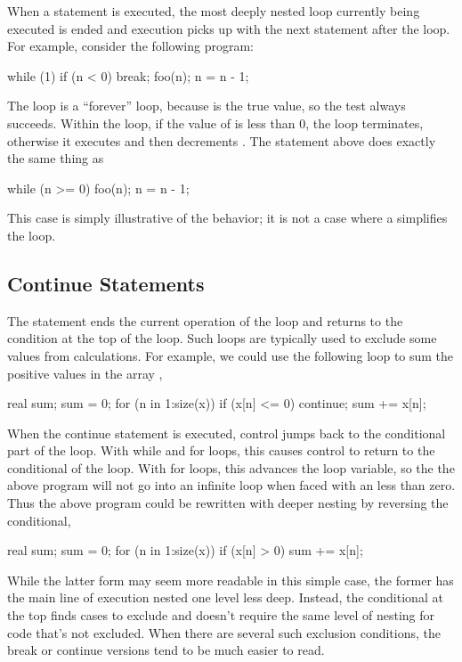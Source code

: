 When a  statement is executed, the most deeply nested loop
currently being executed is ended and execution picks up with the next
statement after the loop.  For example, consider the following
program:
%
\begin{stancode}
while (1) {
  if (n < 0) break;
  foo(n);
  n = n - 1;
}
\end{stancode}
%
The  loop is a ``forever'' loop, because  is
the true value, so the test always succeeds.  Within the loop, if the
value of  is less than 0, the loop terminates, otherwise it
executes  and then decrements .  The statement
above does exactly the same thing as
%
\begin{stancode}
while (n >= 0) {
  foo(n);
  n = n - 1;
}
\end{stancode}
%
This case is simply illustrative of the behavior; it is not a case
where a  simplifies the loop.

\subsection{Continue Statements}

The  statement ends the current operation of the loop
and returns to the condition at the top of the loop.  Such loops are
typically used to exclude some values from calculations.  For example,
we could use the following loop to sum the positive values in the
array ,
%
\begin{stancode}
real sum;
sum = 0;
for (n in 1:size(x)) {
  if (x[n] <= 0) continue;
  sum += x[n];
}
\end{stancode}
%
When the continue statement is executed, control jumps back to the
conditional part of the loop.  With while and for loops, this causes
control to return to the conditional of the loop.  With for loops,
this advances the loop variable, so the the above program will not go
into an infinite loop when faced with an  less than zero.
Thus the above program could be rewritten with deeper nesting by
reversing the conditional,
%
\begin{stancode}
real sum;
sum = 0;
for (n in 1:size(x)) {
  if (x[n] > 0)
    sum += x[n];
}
\end{stancode}
%
While the latter form may seem more readable in this simple case, the
former has the main line of execution nested one level less deep.
Instead, the conditional at the top finds cases to exclude and doesn't
require the same level of nesting for code that's not excluded.  When
there are several such exclusion conditions, the break or continue
versions tend to be much easier to read.

